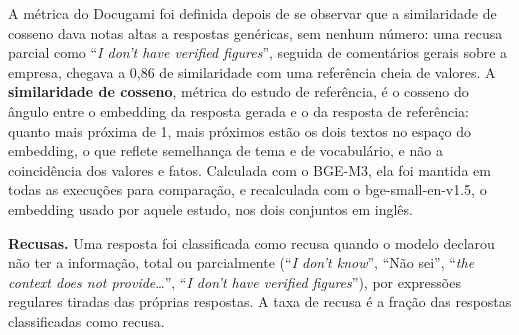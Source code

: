 A métrica do Docugami foi definida depois de se observar que a similaridade de cosseno dava notas altas a respostas genéricas, sem nenhum número: uma recusa parcial como ``\emph{I don't have verified figures}'', seguida de comentários gerais sobre a empresa, chegava a 0,86 de similaridade com uma referência cheia de valores. A \textbf{similaridade de cosseno}, métrica do estudo de referência, é o cosseno do ângulo entre o embedding da resposta gerada e o da resposta de referência: quanto mais próxima de 1, mais próximos estão os dois textos no espaço do embedding, o que reflete semelhança de tema e de vocabulário, e não a coincidência dos valores e fatos. Calculada com o BGE-M3, ela foi mantida em todas as execuções para comparação, e recalculada com o bge-small-en-v1.5, o embedding usado por aquele estudo, nos dois conjuntos em inglês.

\textbf{Recusas.} Uma resposta foi classificada como recusa quando o modelo declarou não ter a informação, total ou parcialmente (``\emph{I don't know}'', ``Não sei'', ``\emph{the context does not provide}\ldots'', ``\emph{I don't have verified figures}''), por expressões regulares tiradas das próprias respostas. A taxa de recusa é a fração das respostas classificadas como recusa.

